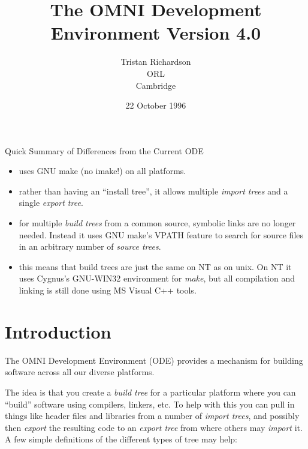 \documentclass[11pt]{article}
\title{The OMNI Development Environment Version 4.0}
\author{Tristan Richardson\\
        ORL\\
        Cambridge}
\date{22 October 1996}
\begin{document}
\maketitle

{\Large Quick Summary of Differences from the Current ODE}

\begin{itemize}

\item uses GNU make (no imake!) on all platforms.

\item rather than having an ``install tree'', it allows multiple {\em
import trees} and a single {\em export tree}.

\item for multiple {\em build trees} from a common source, symbolic links are
no longer needed.  Instead it uses GNU make's VPATH feature to search for
source files in an arbitrary number of {\em source trees}.

\item this means that build trees are just the same on NT as on unix.  On NT it
uses Cygnus's GNU-WIN32 environment for {\em make}, but all compilation and
linking is still done using MS Visual C++ tools.

\end{itemize}

\section{Introduction}

The OMNI Development Environment (ODE) provides a mechanism for building
software across all our diverse platforms.

The idea is that you create a {\em build tree} for a particular platform where
you can ``build'' software using compilers, linkers, etc.  To help with this
you can pull in things like header files and libraries from a number of {\em
import trees}, and possibly then {\em export} the resulting code to an {\em
export tree} from where others may {\em import} it.  A few simple definitions
of the different types of tree may help:
\end{document}
